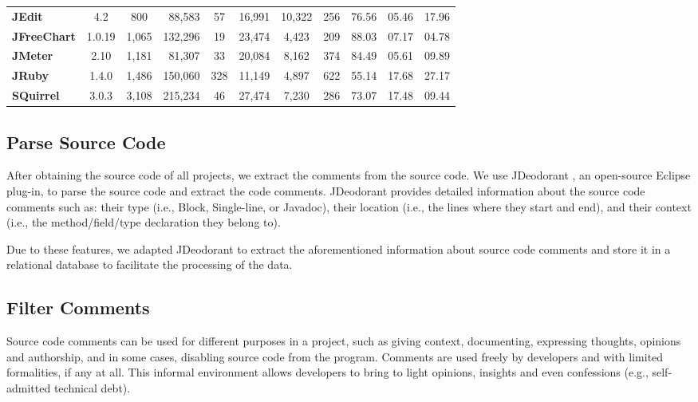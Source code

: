 \begin{table}[thb!]
\begin{center}
\begin{tabular}{l| c c r c || c c c || c c c}
            \textbf{JEdit}          & 4.2      &   800 &  88,583 & 57  & 16,991 &  10,322 &    256 &  76.56  & 05.46  & 17.96 \\
            \textbf{JFreeChart}     & 1.0.19   & 1,065 & 132,296 & 19  & 23,474 &   4,423 &    209 &  88.03  & 07.17  & 04.78 \\
            \textbf{JMeter}         & 2.10     & 1,181 &  81,307 & 33  & 20,084 &   8,162 &    374 &  84.49  & 05.61  & 09.89 \\
            \textbf{JRuby}          & 1.4.0    & 1,486 & 150,060 & 328 & 11,149 &   4,897 &    622 &  55.14  & 17.68  & 27.17 \\ 
            \textbf{SQuirrel}       & 3.0.3    & 3,108 & 215,234 & 46  & 27,474 &   7,230 &    286 &  73.07  & 17.48  & 09.44 \\ 
            \bottomrule             
        \end{tabular}
    \end{center}
\end{table}

\subsection{Parse Source Code} 
\label{sub:parse_source_code}

After obtaining the source code of all projects, we extract the comments from the source code. We use JDeodorant \cite{Tsantalis2008CSMR}, an open-source Eclipse plug-in, to parse the source code and extract the code comments. JDeodorant provides detailed information about the source code comments such as: their type (i.e., Block, Single-line, or Javadoc), their location (i.e., the lines where they start and end), and their context (i.e., the method/field/type declaration they belong to).  

Due to these features, we adapted JDeodorant to extract the aforementioned information about source code comments and store it in a relational database to facilitate the processing of the data. 

\subsection{Filter Comments} 
\label{sub:filter_comments}

Source code comments can be used for different purposes in a project, such as giving context, documenting, expressing thoughts, opinions and authorship, and in some cases, disabling source code from the program. Comments are used freely by developers and with limited formalities, if any at all. This informal environment allows developers to bring to light opinions, insights and even confessions (e.g., self-admitted technical debt). 

